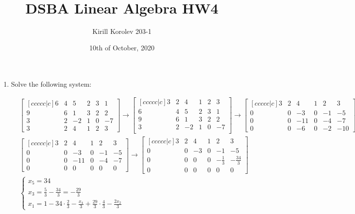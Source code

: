 \documentclass{article}
\title{DSBA Linear Algebra HW4}
\author{Kirill Korolev 203-1}
\date{10th of October, 2020}
\begin{document}
\maketitle

\begin{enumerate}

\item Solve the following system:

\begin{align*}
&\begin{bmatrix}[ccccc|c]
6 & 4 & 5 & 2 & 3 & 1\\
9 & 6 & 1 & 3 & 2 & 2\\
3 & 2 & -2 & 1 & 0 & -7\\
3 & 2 & 4 & 1 & 2 & 3
\end{bmatrix}
\to
\begin{bmatrix}[ccccc|c]
3 & 2 & 4 & 1 & 2 & 3\\
6 & 4 & 5 & 2 & 3 & 1\\
9 & 6 & 1 & 3 & 2 & 2\\
3 & 2 & -2 & 1 & 0 & -7\\
\end{bmatrix}
\to
\begin{bmatrix}[ccccc|c]
3 & 2 & 4 & 1 & 2 & 3\\
0 & 0 & -3 & 0 & -1 & -5\\
0 & 0 & -11 & 0 & -4 & -7\\
0 & 0 & -6 & 0 & -2 & -10
\end{bmatrix}
\to\\
&\begin{bmatrix}[ccccc|c]
3 & 2 & 4 & 1 & 2 & 3\\
0 & 0 & -3 & 0 & -1 & -5\\
0 & 0 & -11 & 0 & -4 & -7\\
0 & 0 & 0 & 0 & 0 & 0
\end{bmatrix}
\to
\begin{bmatrix}[ccccc|c]
3 & 2 & 4 & 1 & 2 & 3\\
0 & 0 & -3 & 0 & -1 & -5\\
0 & 0 & 0 & 0 & -\frac{1}{3} & -\frac{34}{3}\\
0 & 0 & 0 & 0 & 0 & 0
\end{bmatrix}\\
&\begin{cases}
x_5 = 34\\
x_3 = \frac{5}{3} - \frac{34}{3} = -\frac{29}{3}\\
x_1 = 1 - 34 \cdot \frac{2}{3} - \frac{x_4}{3} + \frac{29}{3} \cdot \frac{4}{3} - \frac{2x_2}{3}
\end{cases}
\end{align*}


\end{enumerate}
\end{document}
